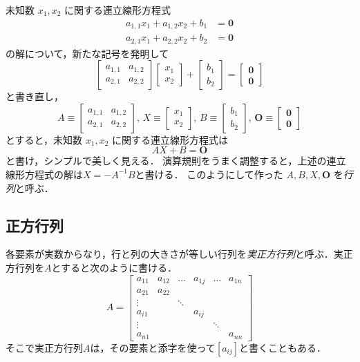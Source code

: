 \documentclass{jsbook}
\newcommand{\keyword}[1]{\emph{#1}}
\newcommand{\zero}{\mathbf{0}}
\newcommand{\Zero}{\mathbf{O}}
\begin{document}
未知数 $x_1,x_2$ に関する連立線形方程式
\begin{align}
a_{1,1}x_1+a_{1,2}x_2+b_1&=\zero\\
a_{2,1}x_1+a_{2,2}x_2+b_2&=\zero
\end{align}
の解について，新たな記号を発明して
\begin{equation}
\begin{bmatrix}a_{1,1}&a_{1,2}\\a_{2,1}&a_{2,2}\end{bmatrix}\begin{bmatrix}x_1\\x_2\end{bmatrix}+\begin{bmatrix}b_1\\b_2\end{bmatrix}=\begin{bmatrix}\zero\\\zero\end{bmatrix}
\end{equation}
と書き直し，
\begin{equation}
A\equiv\begin{bmatrix}a_{1,1}&a_{1,2}\\a_{2,1}&a_{2,2}\end{bmatrix},\,
X\equiv\begin{bmatrix}x_1\\x_2\end{bmatrix},\,
B\equiv\begin{bmatrix}b_1\\b_2\end{bmatrix},\,
\Zero\equiv\begin{bmatrix}\zero\\\zero\end{bmatrix}
\end{equation}
とすると，未知数 $x_1,x_2$ に関する連立線形方程式は
\begin{equation}
AX+B=\Zero
\end{equation}
と書け，シンプルで美しく見える．
演算規則をうまく調整すると，上述の連立線形方程式の解は$X=-A^{-1}B$と書ける．
このようにして作った $A,B,X,\Zero$ を\keyword{行列}と呼ぶ．

\subsection{正方行列}

各要素が実数からなり，行と列の大きさが等しい行列を\keyword{実正方行列}と呼ぶ．実正方行列を$A$とすると次のように書ける．
\begin{equation}
A=\begin{bmatrix}a_{11}&a_{12}&\dots&a_{1j}&\dots&a_{1n}\\
  a_{21}&a_{22}\\
  \vdots&&\ddots\\
  a_{i1}&&&a_{ij}\\
  \vdots&&&&\ddots\\
  a_{n1}&&&&&a_{nn}\end{bmatrix}
\end{equation}
そこで実正方行列$A$は，その要素と添字を使って$[a_{ij}]$と書くこともある．
\end{document}
